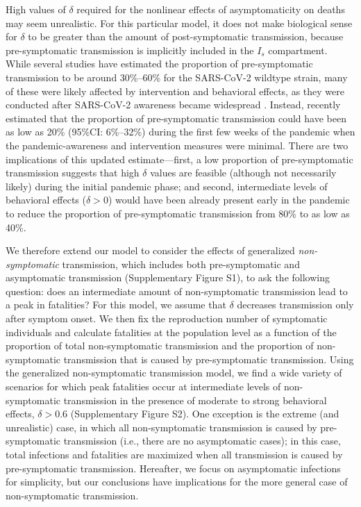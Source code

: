 \documentclass[12pt]{article}
\begin{document}
High values of $\delta$ required for the nonlinear effects of asymptomaticity on deaths may seem unrealistic.
For this particular model, it does not make biological sense for $\delta$ to be greater than the amount of post-symptomatic transmission, because pre-symptomatic transmission is implicitly included in the $I_s$ compartment.
While several studies have estimated the proportion of pre-symptomatic transmission to be around 30\%--60\% for the SARS-CoV-2 wildtype strain, many of these were likely affected by intervention and behavioral effects, as they were conducted after SARS-CoV-2 awareness became widespread \citep{he2020temporal}.
Instead, \cite{sender2021unmitigated} recently estimated that the proportion of pre-symptomatic transmission could have been as low as 20\% (95\%CI: 6\%--32\%) during the first few weeks of the pandemic when the pandemic-awareness and intervention measures were minimal.
There are two implications of this updated estimate---first, a low proportion of pre-symptomatic transmission suggests that high $\delta$ values are feasible (although not necessarily likely) during the initial pandemic phase; and second, intermediate levels of behavioral effects ($\delta > 0$) would have been already present early in the pandemic to reduce the proportion of pre-symptomatic transmission from 80\% to as low as 40\%.

We therefore extend our model to consider the effects of generalized \textit{non-symptomatic} transmission, which includes both pre-symptomatic and asymptomatic transmission (Supplementary Figure S1), to ask the following question:
does an intermediate amount of non-symptomatic transmission lead to a peak in fatalities?
For this model, we assume that $\delta$ decreases transmission only after symptom onset.
We then fix the reproduction number of symptomatic individuals and calculate fatalities at the population level as a function of the proportion of total non-symptomatic transmission and the proportion of non-symptomatic transmission that is caused by pre-symptomatic transmission.
Using the generalized non-symptomatic transmission model, we find a wide variety of scenarios for which peak fatalities occur at intermediate levels of non-symptomatic transmission in the presence of moderate to strong behavioral effects, $\delta > 0.6$ (Supplementary Figure S2).
One exception is the extreme (and unrealistic) case, in which all non-symptomatic transmission is caused by pre-symptomatic transmission (i.e., there are no asymptomatic cases);
in this case, total infections and fatalities are maximized when all transmission is caused by pre-symptomatic transmission. 
Hereafter, we focus on asymptomatic infections for simplicity, but our conclusions have implications for the more general case of non-symptomatic transmission.
\end{document}
